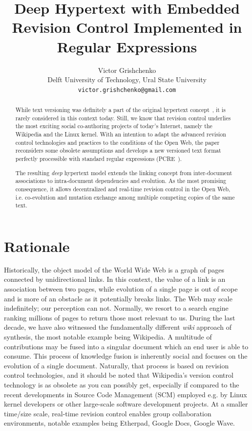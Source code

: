 \documentclass{acm_proc_article-sp}
\date{}
\begin{document}
\title{Deep Hypertext with Embedded Revision Control Implemented in Regular Expressions}

\author{Victor Grishchenko \\ \small Delft University of Technology, Ural State University \\ {\tt victor.grishchenko@gmail.com} }

\maketitle

\begin{abstract}
While text versioning was definitely a part of the original
hypertext concept~\cite{nls,literary,hyp-ed-sys},
it is rarely considered in this context today.
Still, we know that revision control underlies the most exciting
social co-authoring projects of today's Internet, namely the
Wikipedia and the Linux kernel. With an intention to adapt the
advanced revision control technologies and practices to the
conditions of the Open Web, the paper reconsiders some obsolete
assumptions and develops a new versioned text format perfectly
processible with standard regular expressions (PCRE~\cite{pcre}).

The resulting \emph{deep} hypertext model extends the linking
concept from inter-document associations to intra-document
dependencies and evolution. As the most promising consequence,
it allows decentralized and real-time revision control in the Open
Web, i.e. co-evolution and mutation exchange among multiple
competing copies of the same text. 

\end{abstract}


\section{Rationale}

Historically, the object model of the World Wide Web is a graph
of pages connected by unidirectional links. In this context,
the value of a link is an association between two pages, while
evolution of a single page is out of scope and is more of an
obstacle as it potentially breaks links.
The Web may scale indefinitely; our perception can not. 
Normally, we resort to a search engine ranking millions of
pages to return those most relevant to us.
During the last decade, we have also witnessed the fundamentally
different \emph{wiki} approach of synthesis, the most notable
example being Wikipedia. A multitude of contributions may be
fused into a singular document which an end user is able to consume.
This process of knowledge fusion is inherently social and
focuses on the evolution of a single document.
Naturally, that process is based on revision control technologies,
and it should be noted that Wikipedia's version control
technology is as obsolete as you can possibly get, especially
if compared to the recent developments in Source Code Management
(SCM) employed e.g. by Linux kernel developers or other 
large-scale software development projects.
At a smaller time/size scale, real-time revision control
enables group collaboration environments, notable examples
being Etherpad, Google Docs, Google Wave.
\end{document}

